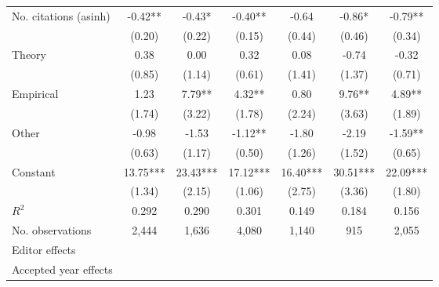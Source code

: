 \begin{table}
\begin{threeparttable}
\begin{tabular}{p{3.78cm}S@{}S@{}S@{}S@{}S@{}S@{}}
            No. citations (asinh)         &       -0.42** &       -0.43*  &       -0.40** &       -0.64   &       -0.86*  &       -0.79** \\
                                          &      (0.20)   &      (0.22)   &      (0.15)   &      (0.44)   &      (0.46)   &      (0.34)   \\
            Theory                        &        0.38   &        0.00   &        0.32   &        0.08   &       -0.74   &       -0.32   \\
                                          &      (0.85)   &      (1.14)   &      (0.61)   &      (1.41)   &      (1.37)   &      (0.71)   \\
            Empirical                     &        1.23   &        7.79** &        4.32** &        0.80   &        9.76** &        4.89** \\
                                          &      (1.74)   &      (3.22)   &      (1.78)   &      (2.24)   &      (3.63)   &      (1.89)   \\
            Other                         &       -0.98   &       -1.53   &       -1.12** &       -1.80   &       -2.19   &       -1.59** \\
                                          &      (0.63)   &      (1.17)   &      (0.50)   &      (1.26)   &      (1.52)   &      (0.65)   \\
            Constant                      &       13.75***&       23.43***&       17.12***&       16.40***&       30.51***&       22.09***\\
                                          &      (1.34)   &      (2.15)   &      (1.06)   &      (2.75)   &      (3.36)   &      (1.80)   \\
            \midrule
            \(R^2\)                       &       0.292   &       0.290   &       0.301   &       0.149   &       0.184   &       0.156   \\
            No. observations              &       2,444   &       1,636   &       4,080   &       1,140   &         915   &       2,055   \\
            \midrule
            Editor effects       &           {}   &           {}   &           {}   &           {}   &           {}   &           {}   \\
            Accepted year effects         &           {}   &           {}   &               &           {}   &           {}   &               \\

\end{tabular}
\end{threeparttable}
\end{table}
